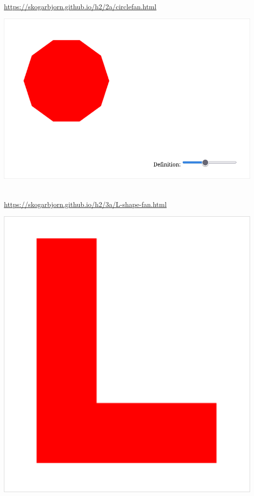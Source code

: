 \documentclass{article}
\begin{document}
\begin{itemize}
	\end{itemize}

	\section{}
	
	\url{https://skogarbjorn.github.io/h2/2a/circlefan.html}

	\includegraphics[scale=0.35]{circle.png}
			
	\section{}
	
	\url{https://skogarbjorn.github.io/h2/3a/L-shape-fan.html}
	
	\begin{center}
	\includegraphics[scale=0.4]{l.png}
	\end{center}
\end{document}
